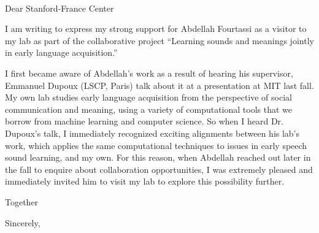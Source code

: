 \documentclass[12pt]{letter}
\begin{document}
\begin{letter}{~~}


\opening{Dear Stanford-France Center}

I am writing to express my strong support for Abdellah Fourtassi as a visitor to my lab as part of the collaborative project ``Learning sounds and meanings jointly in early language acquisition.''

I first became aware of Abdellah's work as a result of hearing his supervisor, Emmanuel Dupoux (LSCP, Paris) talk about it at a presentation at MIT last fall. My own lab studies early language acquisition from the perspective of social communication and meaning, using a variety of computational tools that we borrow from machine learning and computer science. So when I heard Dr. Dupoux's talk, I immediately recognized exciting alignments between his lab's work, which applies the same computational techniques to issues in early speech sound learning, and my own. For this reason, when Abdellah reached out later in the fall to enquire about collaboration opportunities, I was extremely pleased and immediately invited him to visit my lab to explore this possibility further. 

Together 

\closing{Sincerely,}

\end{letter}
\end{document}
